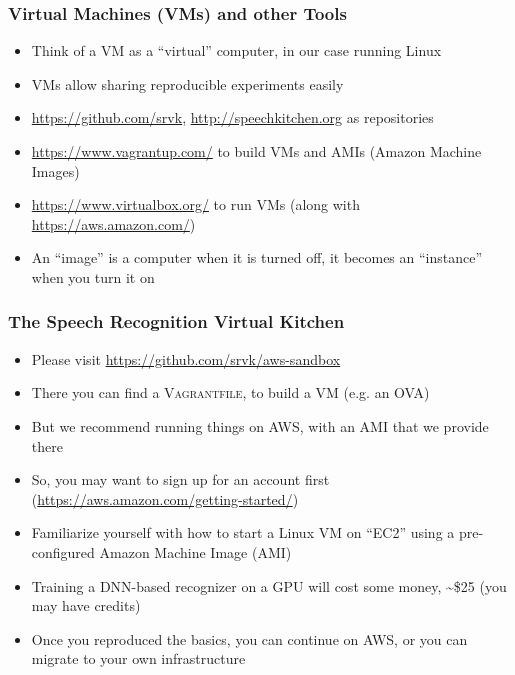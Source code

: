 \begin{frame}
  \frametitle{Virtual Machines (VMs) and other Tools}
  \begin{itemize}
  \item Think of a VM as a ``virtual'' computer, in our case running Linux
  \item VMs allow sharing reproducible experiments easily
  \item \url{https://github.com/srvk}, \url{http://speechkitchen.org} as repositories
  \item \url{https://www.vagrantup.com/} to build VMs and AMIs (Amazon Machine Images)
  \item \url{https://www.virtualbox.org/} to run VMs (along with \url{https://aws.amazon.com/})
  \item An ``image'' is a computer when it is turned off, it becomes an ``instance'' when you turn it on
  \end{itemize}
\end{frame}

\begin{frame}
  \frametitle{The Speech Recognition Virtual Kitchen}
  \begin{itemize}
  \item Please visit \url{https://github.com/srvk/aws-sandbox}
  \item There you can find a \textsc{Vagrantfile}, to build a VM (e.g. an OVA)
  \item But we recommend running things on AWS, with an \textsc{AMI} that we provide there
  \item So, you may want to sign up for an account first (\url{https://aws.amazon.com/getting-started/})
  \item Familiarize yourself with how to start a Linux VM on ``EC2'' using a pre-configured Amazon Machine Image (AMI)
  \item Training a DNN-based recognizer on a GPU will cost some money, \textasciitilde \$25 (you may have credits)
  \item Once you reproduced the basics, you can continue on AWS, or you can migrate to your own infrastructure
  \end{itemize}
\end{frame}

